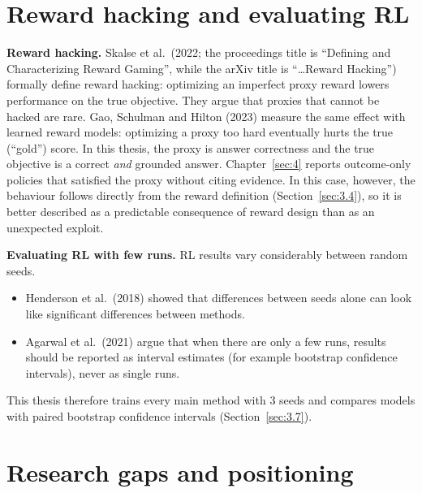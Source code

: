 \section{Reward hacking and evaluating RL}\label{sec:2.8}

\textbf{Reward hacking.} Skalse et al.~(2022; the proceedings title is
``Defining and Characterizing Reward Gaming'', while the arXiv title is
``\ldots Reward Hacking'') formally define reward hacking: optimizing an
imperfect proxy reward lowers performance on the true objective. They
argue that proxies that cannot be hacked are rare. Gao, Schulman and
Hilton (2023) measure the same effect with learned reward models:
optimizing a proxy too hard eventually hurts the true (``gold'') score.
In this thesis, the proxy is answer correctness and the true objective
is a correct \emph{and} grounded answer. Chapter~\ref{sec:4} reports
outcome-only policies that satisfied the proxy without citing evidence.
In this case, however, the behaviour follows directly from the reward
definition (Section~\ref{sec:3.4}), so it is better described as a
predictable consequence of reward design than as an unexpected exploit.

\textbf{Evaluating RL with few runs.} RL results vary considerably
between random seeds.

\begin{itemize}
\tightlist
\item
  Henderson et al.~(2018) showed that differences between seeds alone
  can look like significant differences between methods.
\item
  Agarwal et al.~(2021) argue that when there are only a few runs,
  results should be reported as interval estimates (for example
  bootstrap confidence intervals), never as single runs.
\end{itemize}

This thesis therefore trains every main method with 3 seeds and compares
models with paired bootstrap confidence intervals
(Section~\ref{sec:3.7}).

\section{Research gaps and positioning}\label{sec:2.9}

